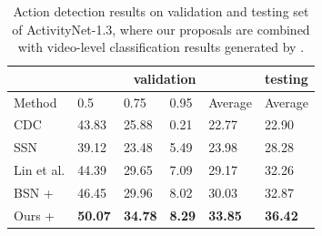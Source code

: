 \documentclass[10pt,twocolumn,letterpaper]{article}
\begin{document}
\begin{table}[tbp]
\centering
\caption{Action detection results on validation and testing set of ActivityNet-1.3, where our proposals are combined with video-level classification results generated by \cite{zhao2017cuhk}.  }
\small
\begin{tabular}{p{2.1cm}p{0.62cm}<{\centering}p{0.62cm}<{\centering}p{0.62cm}<{\centering}p{0.9cm}<{\centering}p{0.9cm}<{\centering}}
\toprule
 & \multicolumn{4}{c}{validation} & testing  \\
\hline
Method  & 0.5  &  0.75  & 0.95  & Average  & Average  \\
\hline
CDC \cite{shou2017cdc}    & 43.83  & 25.88  & 0.21   & 22.77  & 22.90 \\
SSN \cite{xiong2017pursuit}    & 39.12 & 23.48  & 5.49  & 23.98 & 28.28 \\
Lin et al. \cite{lin2017temporal} & 44.39   & 29.65  & 7.09  & 29.17 & 32.26 \\
BSN \cite{lin2018bsn} + \cite{zhao2017cuhk} & 46.45  & 29.96 & 8.02  & 30.03 & 32.87 \\
\hline
Ours + \cite{zhao2017cuhk} & {\bf 50.07} & {\bf 34.78} & {\bf 8.29} & {\bf 33.85} & {\bf 36.42} \\
\bottomrule
\end{tabular}
\label{table_detection_anet}
\end{table}
\end{document}
